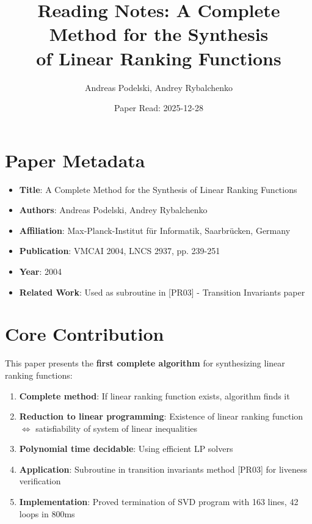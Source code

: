 \documentclass{article}
\title{Reading Notes: A Complete Method for the Synthesis\\
of Linear Ranking Functions}
\author{Andreas Podelski, Andrey Rybalchenko}
\date{Paper Read: 2025-12-28}
\begin{document}
\maketitle

\section{Paper Metadata}

\begin{itemize}
    \item \textbf{Title}: A Complete Method for the Synthesis of Linear Ranking Functions
    \item \textbf{Authors}: Andreas Podelski, Andrey Rybalchenko
    \item \textbf{Affiliation}: Max-Planck-Institut für Informatik, Saarbrücken, Germany
    \item \textbf{Publication}: VMCAI 2004, LNCS 2937, pp. 239-251
    \item \textbf{Year}: 2004
    \item \textbf{Related Work}: Used as subroutine in [PR03] - Transition Invariants paper
\end{itemize}

\section{Core Contribution}

This paper presents the \textbf{first complete algorithm} for synthesizing linear ranking functions:

\begin{enumerate}
    \item \textbf{Complete method}: If linear ranking function exists, algorithm finds it

    \item \textbf{Reduction to linear programming}: Existence of linear ranking function $\Leftrightarrow$ satisfiability of system of linear inequalities

    \item \textbf{Polynomial time decidable}: Using efficient LP solvers

    \item \textbf{Application}: Subroutine in transition invariants method [PR03] for liveness verification

    \item \textbf{Implementation}: Proved termination of SVD program with 163 lines, 42 loops in 800ms
\end{enumerate}
\end{document}
